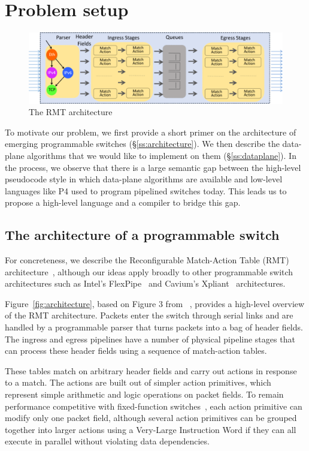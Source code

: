 \section{Problem setup}
\label{s:context}

\begin{figure}
\includegraphics[width=\textwidth]{p4_switch_model.png}
\caption{The RMT architecture}
\end{figure}

To motivate our problem, we first provide a short primer on the architecture of
emerging programmable switches (\S\ref{ss:architecture}). We then describe the
data-plane algorithms that we would like to implement on them
(\S\ref{ss:dataplane}). In the process, we observe that there is a large
semantic gap between the high-level pseudocode style in which data-plane
algorithms are available and low-level languages like P4 used to program
pipelined switches today. This leads us to propose a high-level language and a
compiler to bridge this gap.

\subsection{The architecture of a programmable switch}
\label{s:architecture}
For concreteness, we describe the Reconfigurable Match-Action Table (RMT)
architecture~\cite{rmt}, although our ideas apply broadly to other programmable
switch architectures such as Intel's FlexPipe~\cite{flexpipe} and Cavium's
Xpliant~\cite{xpliant} architectures.

Figure~\ref{fig:architecture}, based on Figure 3 from ~\cite{rmt}, provides a
high-level overview of the RMT architecture. Packets enter the switch through
serial links and are handled by a programmable parser that turns packets into a
bag of header fields. The ingress and egress pipelines have a number of
physical pipeline stages that can process these header fields using a sequence
of match-action tables.

These tables match on arbitrary header fields and carry out actions in response
to a match.  The actions are built out of simpler action primitives, which
represent simple arithmetic and logic operations on packet fields. To remain
performance competitive with fixed-function switches~\cite{mellanox, broadcom},
each action primitive can modify only one packet field, although several action
primitives can be grouped together into larger actions using a Very-Large
Instruction Word if they can all execute in parallel without violating data
dependencies.

